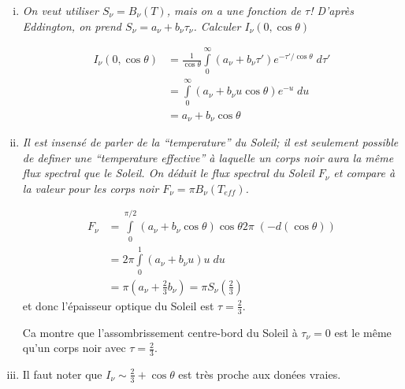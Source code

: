 \documentclass[10pt]{report}
\newcommand{\rd}[2]{\frac{d#1}{d#2}}
\begin{document}
\begin{enumerate}[i)]
        On utilise un ``integrating factor'' $e^{-\frac{\tau_\nu}{\cos\theta}}$ et obtient
        \begin{align}
            \int\limits_{\tau_\nu}^{\infty}\rd{}{\tau}\left( I_\nu e^{-\tau'/\cos\theta} \right)\;d\tau &= \int\limits_{\tau_\nu}^{\infty}-\frac{S_\nu(\tau')}{\cos\theta}e^{-\tau'/\cos\theta}\;d\tau'\\
            I_\nu &= \int\limits_{\tau_\nu}^{\infty}\frac{S_\nu(\tau')}{\cos\theta}e^{(\tau_\nu - \tau')/\cos\theta}\;d\tau'
        \end{align}

        On voit que plus profonds que sauf une profondeur mince sur la surface le Soleil est adiaphane.

    \item \emph{On veut utiliser $S_\nu = B_\nu(T)$, mais on a une fonction de $\tau$! D'apr\`es Eddington, on prend $S_\nu = a_\nu + b_\nu \tau_\nu$. Calculer $I_\nu(0,\cos\theta)$}

        \begin{align}
            I_\nu(0,\cos\theta) &= \frac{1}{\cos\theta}\int\limits_0^{\infty}\left( a_\nu + b_\nu \tau' \right)e^{ - \tau'/\cos\theta}\;d\tau'\\
            &=\int\limits_{0}^{\infty}\left( a_\nu + b_\nu u \cos\theta \right)e^{-u}\;du\\
            &= a_\nu + b_\nu\cos\theta
        \end{align}

    \item \emph{Il est insens\'e de parler de la ``temperature'' du Soleil; il est seulement possible de definer une ``temperature effective'' \`a laquelle un corps noir aura la m\^eme flux spectral que le Soleil. On d\'eduit le flux spectral du Soleil $F_\nu$ et compare \`a la valeur pour les corps noir $F_\nu = \pi B_\nu(T_{eff})$.}

        \begin{align}
            F_\nu &= \int\limits_{0}^{\pi/2}\left( a_\nu + b_\nu\cos\theta \right)\cos\theta 2\pi\;\left( -d(\cos\theta) \right)\\
            &= 2\pi \int\limits_{0}^{1}\left( a_\nu + b_\nu u \right)u\;du\\
            &=\pi\left( a_\nu + \frac{2}{3}b_\nu \right) = \pi S_\nu\left( \frac{2}{3} \right)
        \end{align}
        et donc l'\'epaisseur optique du Soleil est $\tau = \frac{2}{3}$. 

        Ca montre que l'assombrissement centre-bord du Soleil \`a $\tau_\nu = 0$ est le m\^eme qu'un corps noir avec $\tau = \frac{2}{3}$. 

    \item Il faut noter que $I_\nu \sim \frac{2}{3} + \cos \theta$ est tr\`es proche aux don\'ees vraies.
\end{enumerate}
\end{document}
